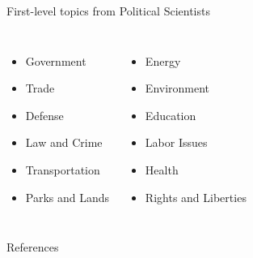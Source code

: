 \documentclass[compress]{beamer}
\begin{document}


\begin{frame}{First-level topics from Political Scientists}

\begin{columns}
		\begin{itemize}
			\item Government 
			\item Trade
			\item Defense
			\item Law and Crime 
			\item Transportation 		
			\item Parks and Lands 										
		\end{itemize}
		\begin{itemize}
			\item Energy 
			\item Environment 
			\item Education 
			\item Labor Issues 
			\item Health 
			\item Rights and Liberties 												
		\end{itemize}
	
\end{columns}

\end{frame}


\begin{frame}{References}

\tiny

\end{frame}
\end{document}
